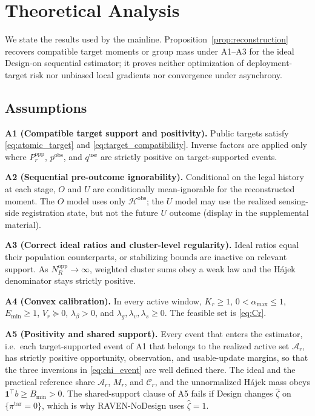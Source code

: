 \documentclass[letterpaper,journal]{IEEEtran}
\begin{document}
\section{Theoretical Analysis}
\label{sec:theory}

We state the results used by the mainline.  Proposition~\ref{prop:reconstruction}
recovers compatible target moments or group mass under A1--A3 for the ideal
Design-on sequential estimator; it proves neither optimization of
deployment-target risk nor unbiased local gradients nor convergence under
asynchrony.

\subsection{Assumptions}
\label{subsec:assumptions}

\noindent\textbf{A1 (Compatible target support and positivity).}
Public targets satisfy \eqref{eq:atomic_target} and
\eqref{eq:target_compatibility}.  Inverse factors are applied only where
$P_r^{\mathrm{opp}}$, $p^{\mathrm{obs}}$, and $q^{\mathrm{use}}$ are
strictly positive on target-supported events.

\noindent\textbf{A2 (Sequential pre-outcome ignorability).}
Conditional on the legal history at each stage, $O$ and $U$ are
conditionally mean-ignorable for the reconstructed moment.  The $O$ model
uses only $\mathcal{H}^{\mathrm{obs}}$; the $U$ model may use the realized
sensing-side registration state, but not the future $U$ outcome
(display in the supplemental material).

\noindent\textbf{A3 (Correct ideal ratios and cluster-level regularity).}
Ideal ratios equal their population counterparts, or stabilizing bounds are
inactive on relevant support.  As $N_R^{\mathrm{opp}}\rightarrow\infty$,
weighted cluster sums obey a weak law and the H\'ajek denominator stays
strictly positive.

\noindent\textbf{A4 (Convex calibration).}
In every active window, $K_r\ge1$, $0<\alpha_{\max}\le1$, $E_{\min}\ge1$,
$V_r\succeq0$, $\lambda_{\beta}>0$, and
$\lambda_g,\lambda_v,\lambda_s\ge0$.  The feasible set is \eqref{eq:Cr}.

\noindent\textbf{A5 (Positivity and shared support).}
Every event that enters the estimator, i.e.\ each target-supported event of
A1 that belongs to the realized active set $\mathcal{A}_r$, has strictly
positive opportunity, observation, and usable-update margins, so that the
three inversions in \eqref{eq:chi_event} are well defined there.  The ideal and
the practical reference share $\mathcal{A}_r$, $M_r$, and $\mathcal{C}_r$,
and the unnormalized H\'ajek mass obeys
$\mathbf{1}^{\top}b\ge B_{\min}>0$.  The shared-support clause of A5 fails
if Design changes $\widehat\zeta$ on $\{\pi^{\mathrm{tar}}=0\}$, which is why
RAVEN-NoDesign uses $\widehat\zeta=1$.
\end{document}
